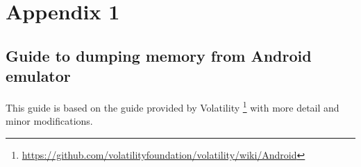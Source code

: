 \newcommand*\justify{%
  \fontdimen2\font=0.4em%
  \fontdimen3\font=0.2em%
  \fontdimen4\font=0.1em%
  \fontdimen7\font=0.1em%
  \hyphenchar\font=`\-%
}

\section{Appendix 1}
\subsection{Guide to dumping memory from Android emulator}
  This guide is based on the guide provided by Volatility \footnote{\url{https://github.com/volatilityfoundation/volatility/wiki/Android}} 
  with more detail and minor modifications.\\
  
